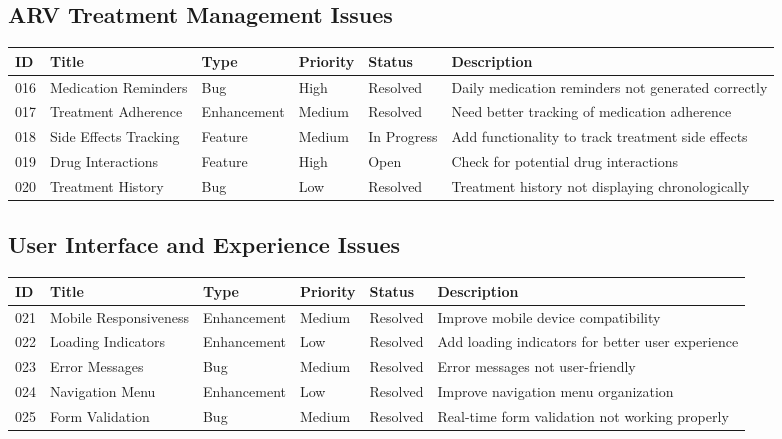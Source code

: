 \documentclass[12pt,a4paper]{article}
\begin{document}
\subsection{ARV Treatment Management Issues}

\begin{longtable}{|p{0.8cm}|p{2.5cm}|p{1.5cm}|p{1.5cm}|p{1.5cm}|p{4.2cm}|}
\hline
\textbf{ID} & \textbf{Title} & \textbf{Type} & \textbf{Priority} & \textbf{Status} & \textbf{Description} \\
\hline
016 & Medication Reminders & Bug & High & Resolved & Daily medication reminders not generated correctly \\
\hline
017 & Treatment Adherence & Enhancement & Medium & Resolved & Need better tracking of medication adherence \\
\hline
018 & Side Effects Tracking & Feature & Medium & In Progress & Add functionality to track treatment side effects \\
\hline
019 & Drug Interactions & Feature & High & Open & Check for potential drug interactions \\
\hline
020 & Treatment History & Bug & Low & Resolved & Treatment history not displaying chronologically \\
\hline
\end{longtable}

\subsection{User Interface and Experience Issues}

\begin{longtable}{|p{0.8cm}|p{2.5cm}|p{1.5cm}|p{1.5cm}|p{1.5cm}|p{4.2cm}|}
\hline
\textbf{ID} & \textbf{Title} & \textbf{Type} & \textbf{Priority} & \textbf{Status} & \textbf{Description} \\
\hline
021 & Mobile Responsiveness & Enhancement & Medium & Resolved & Improve mobile device compatibility \\
\hline
022 & Loading Indicators & Enhancement & Low & Resolved & Add loading indicators for better user experience \\
\hline
023 & Error Messages & Bug & Medium & Resolved & Error messages not user-friendly \\
\hline
024 & Navigation Menu & Enhancement & Low & Resolved & Improve navigation menu organization \\
\hline
025 & Form Validation & Bug & Medium & Resolved & Real-time form validation not working properly \\
\hline
\end{longtable}
\end{document}
